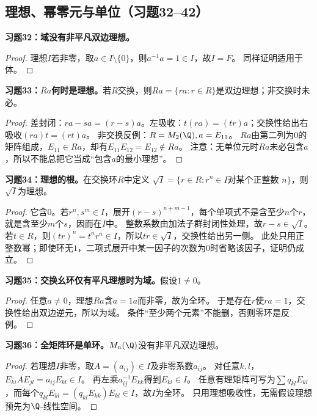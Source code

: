 \subsection*{理想、幂零元与单位（习题32--42）}

\begin{problem}
\textbf{习题32：域没有非平凡双边理想。}
\end{problem}
\begin{proof}
理想$I$若非零，取$a\in I\setminus\{0\}$，则$a^{-1}a=1\in I$，故$I=F$。
同样证明适用于体。
\end{proof}

\begin{problem}
\textbf{习题33：$Ra$何时是理想。}若$R$交换，则$Ra=\{ra:r\in R\}$是双边理想；非交换时未必。
\end{problem}
\begin{proof}
差封闭：$ra-sa=(r-s)a$。左吸收：$t(ra)=(tr)a$；交换性给出右吸收$(ra)t=(rt)a$。
非交换反例：$R=M_2(\Q),a=E_{11}$。
$Ra$由第二列为0的矩阵组成，$E_{11}\in Ra$，却有$E_{11}E_{12}=E_{12}\notin Ra$。
注意：无单位元时$Ra$未必包含$a$，所以不能总把它当成“包含$a$的最小理想”。
\end{proof}

\begin{problem}
\textbf{习题34：理想的根。}在交换环$R$中定义
$\sqrt I=\{r\in R:r^n\in I\text{对某个正整数 }n\}$，则$\sqrt I$为理想。
\end{problem}
\begin{proof}
它含0。若$r^n,s^m\in I$，展开$(r-s)^{n+m-1}$，每个单项式不是含至少$n$个$r$，就是含至少$m$个$s$，因而在$I$中。
整数系数由加法子群封闭性处理，故$r-s\in\sqrt I$。
若$t\in R$，则$(tr)^n=t^nr^n\in I$，所以$tr\in\sqrt I$，交换性给出另一侧。
此处只用正整数幂；即使环无$1$，二项式展开中某一因子的次数为0时省略该因子，证明仍成立。
\end{proof}

\begin{problem}
\textbf{习题35：交换幺环仅有平凡理想时为域。}假设$1\neq0$。
\end{problem}
\begin{proof}
任意$a\neq0$，理想$Ra$含$a=1a$而非零，故为全环。
于是存在$r$使$ra=1$，交换性给出双边逆元，所以为域。
条件“至少两个元素”不能删，否则零环是反例。
\end{proof}

\begin{problem}
\textbf{习题36：全矩阵环是单环。}$M_n(\Q)$没有非平凡双边理想。
\end{problem}
\begin{proof}
若理想$I$非零，取$A=(a_{ij})\in I$及非零系数$a_{ij}$。
对任意$k,l$，$E_{ki}AE_{jl}=a_{ij}E_{kl}\in I$。
再左乘$a_{ij}^{-1}E_{kk}$得到$E_{kl}\in I$。
任意有理矩阵可写为$\sum q_{kl}E_{kl}$，而每个$q_{kl}E_{kl}=(q_{kl}E_{kk})E_{kl}\in I$，故$I$为全环。
只用理想吸收性，无需假设理想预先为$\Q$-线性空间。
\end{proof}

